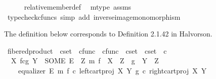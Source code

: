 \begin{isabellebody}
\ \ \ \ \isamarkupfalse%
\ relative{\isacharunderscore}{\kern0pt}member{\isacharunderscore}{\kern0pt}def{}\ \isamarkupfalse%
\ m{\isacharunderscore}{\kern0pt}type\ assms\isanewline
\ \ \ \ \isamarkupfalse%
\ {\isacharparenleft}{\kern0pt}typecheck{\isacharunderscore}{\kern0pt}cfuncs{\isacharcomma}{\kern0pt}\ simp\ add{\isacharcolon}{\kern0pt}\ inverse{\isacharunderscore}{\kern0pt}image{\isacharunderscore}{\kern0pt}monomorphism{\isacharparenright}{\kern0pt}\isanewline
{}\isamarkupfalse%
%
\endisatagproof
{\isafoldproof}%
%
\isadelimproof
%
\endisadelimproof
%
\isadelimdocument
%
\endisadelimdocument
%
\isatagdocument
%
\isamarkuptrue%
%
\endisatagdocument
{\isafolddocument}%
%
\isadelimdocument
%
\endisadelimdocument
%
\begin{isamarkuptext}%
The definition below corresponds to Definition 2.1.42 in Halvorson.%
\end{isamarkuptext}\isamarkuptrue%
\isamarkupfalse%
\ fibered{\isacharunderscore}{\kern0pt}product\ {\isacharcolon}{\kern0pt}{\isacharcolon}{\kern0pt}\ {\isachardoublequoteopen}cset\ {\isasymRightarrow}\ cfunc\ {\isasymRightarrow}\ cfunc\ {\isasymRightarrow}\ cset\ {\isasymRightarrow}\ cset{\isachardoublequoteclose}\ {\isacharparenleft}{\kern0pt}{\isachardoublequoteopen}{\isacharunderscore}{\kern0pt}\ \isactrlbsub {\isacharunderscore}{\kern0pt}\isactrlesub {\isasymtimes}\isactrlsub c\isactrlbsub {\isacharunderscore}{\kern0pt}\isactrlesub \ {\isacharunderscore}{\kern0pt}{\isachardoublequoteclose}\ {\isacharbrackleft}{\kern0pt}{}{}{\isacharcomma}{\kern0pt}{}{}{\isacharcomma}{\kern0pt}{}{}{\isacharcomma}{\kern0pt}{}{}{\isacharbrackright}{\kern0pt}{}{}{\isacharparenright}{\kern0pt}\ \isanewline
\ \ {\isachardoublequoteopen}X\ \isactrlbsub f\isactrlesub {\isasymtimes}\isactrlsub c\isactrlbsub g\isactrlesub \ Y\ {\isacharequal}{\kern0pt}\ {\isacharparenleft}{\kern0pt}SOME\ E{\isachardot}{\kern0pt}\ {\isasymexists}\ Z\ m{\isachardot}{\kern0pt}\ f\ {\isacharcolon}{\kern0pt}\ X\ {\isasymrightarrow}\ Z\ {\isasymand}\ g\ {\isacharcolon}{\kern0pt}\ Y\ {\isasymrightarrow}\ Z\ {\isasymand}\isanewline
\ \ \ \ equalizer\ E\ m\ {\isacharparenleft}{\kern0pt}f\ {\isasymcirc}\isactrlsub c\ left{\isacharunderscore}{\kern0pt}cart{\isacharunderscore}{\kern0pt}proj\ X\ Y{\isacharparenright}{\kern0pt}\ {\isacharparenleft}{\kern0pt}g\ {\isasymcirc}\isactrlsub c\ right{\isacharunderscore}{\kern0pt}cart{\isacharunderscore}{\kern0pt}proj\ X\ Y{\isacharparenright}{\kern0pt}{\isacharparenright}{\kern0pt}{\isachardoublequoteclose}\isanewline

\end{isabellebody}
